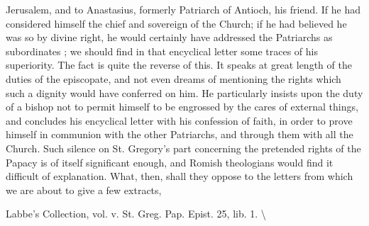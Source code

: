 Jerusalem, and to Anastasius, formerly Patriarch of Antioch, his friend. If he had considered himself the chief and sovereign of the Church; if he had believed he was so by divine right, he would certainly have addressed the Patriarchs as subordinates ; we should find in that encyclical letter some traces of his superiority. The fact is quite the reverse of this. It speaks at great length of the duties of the episcopate, and not even dreams of mentioning the rights which such a dignity would have conferred on him. He particularly insists upon the duty of a bishop not to permit himself to be engrossed by the cares of external things, and concludes his encyclical letter with his confession of faith, in order to prove himself in communion with the other Patriarchs, and through them with all the Church. Such silence on St. Gregory's part concerning the pretended rights of the Papacy is of itself significant enough, and Romish theologians would find it difficult of explanation. What, then, shall they oppose to the letters from which we are about to give a few extracts,

Labbe’s Collection, vol. v. St. Greg. Pap. Epist. 25, lib. 1. \textbackslash{}

